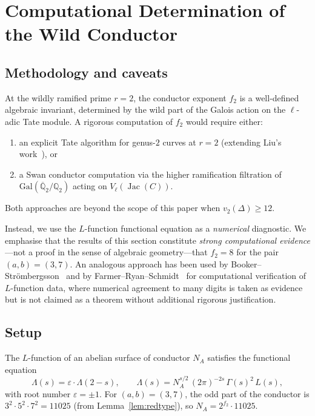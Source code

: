\documentclass[11pt,a4paper]{article}
\newcommand{\Jac}{\operatorname{Jac}}
\newcommand{\Qbar}{\overline{\mathbb{Q}}}
\theoremstyle{definition}
\theoremstyle{remark}
\begin{document}
\section{Computational Determination of the Wild Conductor}\label{sec:feq}

\subsection{Methodology and caveats}

At the wildly ramified prime $r = 2$, the conductor exponent
$f_2$ is a well-defined algebraic invariant, determined by the
wild part of the Galois action on the $\ell$-adic Tate module.
A rigorous computation of $f_2$ would require either:
\begin{enumerate}[label=(\alph*)]
  \item an explicit Tate algorithm for genus-$2$ curves at $r = 2$
    (extending Liu's work~\cite{Liu}), or
  \item a Swan conductor computation via the higher ramification
    filtration of $\mathrm{Gal}(\Qbar_2/\mathbb{Q}_2)$ acting on
    $V_\ell(\Jac(C))$.
\end{enumerate}
Both approaches are beyond the scope of this paper when
$v_2(\Delta) \ge 12$.

Instead, we use the $L$-function functional equation as a
\emph{numerical} diagnostic.
We emphasise that the results of this section constitute
\emph{strong computational evidence}---not a proof in the
sense of algebraic geometry---that $f_2 = 8$ for the pair
$(a,b) = (3,7)$.
An analogous approach has been used by
Booker--Str\"ombergsson~\cite{BookerStrombergsson} and by
Farmer--Ryan--Schmidt~\cite{FarmerRyanSchmidt} for
computational verification of $L$-function data, where
numerical agreement to many digits is taken as
evidence but is not claimed as a theorem without
additional rigorous justification.

\subsection{Setup}

The $L$-function of an abelian surface of conductor $N_A$
satisfies the functional equation
\[
  \Lambda(s) = \varepsilon \cdot \Lambda(2 - s),
  \qquad
  \Lambda(s) = N_A^{s/2}\, (2\pi)^{-2s}\,
  \Gamma(s)^2\, L(s),
\]
with root number $\varepsilon = \pm 1$.
For $(a,b) = (3,7)$, the odd part of the conductor is
$3^2 \cdot 5^2 \cdot 7^2 = 11025$ (from Lemma~\ref{lem:redtype}),
so $N_A = 2^{f_2} \cdot 11025$.
\end{document}
